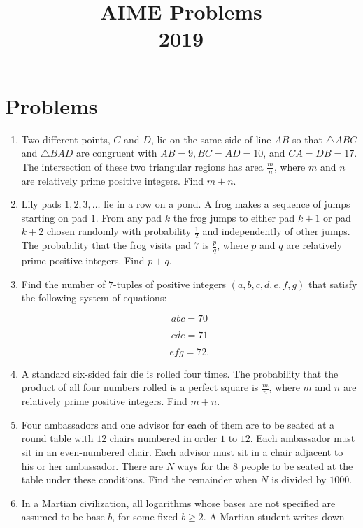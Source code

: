 \documentclass{article}
\title{AIME Problems \\ 2019}
\date{}
\begin{document}
\maketitle\thispagestyle{fancy}\newpage\section*{Problems}\begin{enumerate}[label=\arabic*., itemsep=0.5em]\item Two different points, $C$ and $D$, lie on the same side of line $AB$ so that $\triangle ABC$ and $\triangle BAD$ are congruent with $AB=9,BC=AD=10$, and $CA=DB=17$. The intersection of these two triangular regions has area $\tfrac{m}{n}$, where $m$ and $n$ are relatively prime positive integers. Find $m+n$.\par \vspace{0.5em}\item Lily pads $1,2,3,\ldots$ lie in a row on a pond. A frog makes a sequence of jumps starting on pad $1$. From any pad $k$ the frog jumps to either pad $k+1$ or pad $k+2$ chosen randomly with probability $\tfrac{1}{2}$ and independently of other jumps. The probability that the frog visits pad $7$ is $\tfrac{p}{q}$, where $p$ and $q$ are relatively prime positive integers. Find $p+q$.\par \vspace{0.5em}\item Find the number of $7$-tuples of positive integers $(a,b,c,d,e,f,g)$ that satisfy the following system of equations: 

\begin{equation*}
abc=70
\end{equation*}


\begin{equation*}
cde=71
\end{equation*}


\begin{equation*}
efg=72.
\end{equation*}
\par \vspace{0.5em}\item A standard six-sided fair die is rolled four times. The probability that the product of all four numbers rolled is a perfect square is $\tfrac{m}{n}$, where $m$ and $n$ are relatively prime positive integers. Find $m+n$.\par \vspace{0.5em}\item Four ambassadors and one advisor for each of them are to be seated at a round table with $12$ chairs numbered in order $1$ to $12$. Each ambassador must sit in an even-numbered chair. Each advisor must sit in a chair adjacent to his or her ambassador. There are $N$ ways for the $8$ people to be seated at the table under these conditions. Find the remainder when $N$ is divided by $1000$.\par \vspace{0.5em}\item In a Martian civilization, all logarithms whose bases are not specified are assumed to be base $b$, for some fixed $b\ge2$. A Martian student writes down


\end{enumerate}
\end{document}
